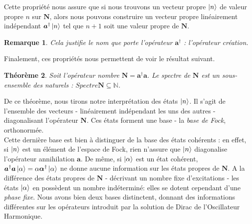 \documentclass[11pt,oneside,a4paper]{article}
\newtheorem{theorem}{Théorème}[section]
\newtheorem{remark}[theorem]{Remarque}
\begin{document}
Cette propriété nous assure que si nous trouvons un vecteur propre $\ket{n}$ de valeur propre $n$ sur $\bm{N}$, alors nous pouvons construire un vecteur propre linéairement indépendant $\bm{a}^\dagger\ket{n}$ tel que $n+1$ soit une valeur propre de $\bm{N}$.
\begin{remark}
  Cela justifie le nom que porte l'opérateur $\bm{a}^\dagger$ : l'opérateur création.
\end{remark}
Finalement, ces propriétés nous permettent de voir le résultat suivant.
\begin{theorem}
  Soit l'opérateur nombre $\bm{N} = \bm{a}^\dagger\bm{a}$. Le spectre de $\bm{N}$ est un sous-ensemble des naturels : $Spectre \bm{N}\subseteq\mathbb{N}$.
\end{theorem}

De ce théorème, nous tirons notre interprétation des états $\ket{n}$. Il s'agit de l'ensemble des vecteurs - linéairement indépendant les uns des autres - diagonalisant l'opérateur $\bm{N}$. Ces états forment une base - la \emph{base de Fock}, orthonormée.\\ 

Cette dernière base est bien à distinguer de la base des états cohérents : en effet, si $\ket{n}$ est un élément de l'espace de Fock, rien n'assure que $\ket{n}$ diagonalise l'opérateur annihilation $\bm{a}$. De même, si $\ket{\alpha}$ est un état cohérent, $\bm{a}^\dagger \bm{a}\ket{\alpha} = \alpha \bm{\alpha}^\dagger\ket{\alpha}$ ne donne aucune information sur les états propres de $\bm{N}$. A la différence des états propres de $\bm{N}$ - décrivant un nombre fixe d'excitations - les états $\ket{\alpha}$ en possèdent un nombre indéterminé: elles se dotent cependant d'une \emph{phase fixe}. Nous avons bien deux bases distinctent, donnant des informations différentes sur les opérateurs introduit par la solution de Dirac de l'Oscillateur Harmonique.\\
\end{document}
